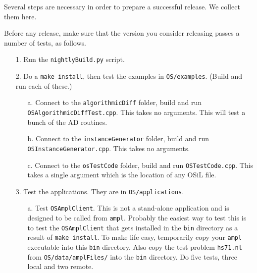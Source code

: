 \label{section:ReleaseProcedure}

Several steps are necessary in order to prepare a successful release. We collect them here.


\label{section:ReleaseTesting}

Before any release, make sure that the version you consider releasing passes a number of tests, as follows. 

\begin{itemize}

\item[1.] Run the {\tt nightlyBuild.py} script.

\item[2.] Do a {\tt make install}, then test the examples in {\tt OS/examples}. (Build and run each of these.) 

\begin{itemize}

\item[a.]  Connect to the {\tt algorithmicDiff} folder, build and run {\tt OSAlgorithmicDiffTest.cpp}.  This takes no arguments.  This will test a bunch of the AD routines.



\item[b.]  Connect to the {\tt instanceGenerator} folder, build and run {\tt OSInstanceGenerator.cpp}.  This takes no arguments.

\item[c.]  Connect to the {\tt osTestCode} folder, build and run {\tt OSTestCode.cpp}.  This takes a single argument which is the location of any OSiL file.


\end{itemize}

\item[3.] Test the applications.  They are in {\tt OS/applications}.

\begin{itemize}
 
 
 \item[a.]  Test {\tt OSAmplClient}.  This is not a stand-alone application and is designed to be called from  {\tt ampl}.   Probably the easiest way to test this is to test the {\tt OSAmplClient}  that gets installed in the {\tt bin} directory as a result of {\tt make install}. To make life easy, temporarily copy your {\tt ampl} executable into this {\tt bin} directory.   Also copy the test problem {\tt hs71.nl}  from {\tt OS/data/amplFiles/} into the {\tt bin} directory.   Do five tests, three local and two remote.
 

\end{itemize}
\end{itemize}
